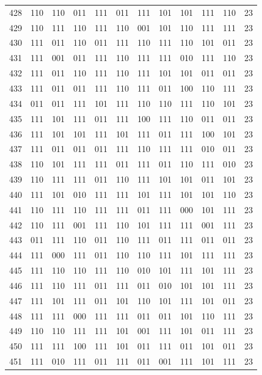 \begin{longtable}{r*{10}{c}r}
428 & 110 & 110 & 011 & 111 & 011 & 111 & 101 & 101 & 111 & 110 & 23\\
429 & 110 & 111 & 110 & 111 & 110 & 001 & 101 & 110 & 111 & 111 & 23\\
430 & 111 & 011 & 110 & 011 & 111 & 110 & 111 & 110 & 101 & 011 & 23\\
431 & 111 & 001 & 011 & 111 & 110 & 111 & 111 & 010 & 111 & 110 & 23\\
432 & 111 & 011 & 110 & 111 & 110 & 111 & 101 & 101 & 011 & 011 & 23\\
433 & 111 & 011 & 011 & 111 & 110 & 111 & 011 & 100 & 110 & 111 & 23\\
434 & 011 & 011 & 111 & 101 & 111 & 110 & 110 & 111 & 110 & 101 & 23\\
435 & 111 & 101 & 111 & 011 & 111 & 100 & 111 & 110 & 011 & 011 & 23\\
436 & 111 & 101 & 101 & 111 & 101 & 111 & 011 & 111 & 100 & 101 & 23\\
437 & 111 & 011 & 011 & 011 & 111 & 110 & 111 & 111 & 010 & 011 & 23\\
438 & 110 & 101 & 111 & 111 & 011 & 111 & 011 & 110 & 111 & 010 & 23\\
439 & 110 & 111 & 111 & 011 & 110 & 111 & 101 & 101 & 011 & 101 & 23\\
440 & 111 & 101 & 010 & 111 & 111 & 101 & 111 & 101 & 101 & 110 & 23\\
441 & 110 & 111 & 110 & 111 & 111 & 011 & 111 & 000 & 101 & 111 & 23\\
442 & 110 & 111 & 001 & 111 & 110 & 101 & 111 & 111 & 001 & 111 & 23\\
443 & 011 & 111 & 110 & 011 & 110 & 111 & 011 & 111 & 011 & 011 & 23\\
444 & 111 & 000 & 111 & 011 & 110 & 110 & 111 & 101 & 111 & 111 & 23\\
445 & 111 & 110 & 110 & 111 & 110 & 010 & 101 & 111 & 101 & 111 & 23\\
446 & 111 & 110 & 111 & 011 & 111 & 011 & 010 & 101 & 101 & 111 & 23\\
447 & 111 & 101 & 111 & 011 & 101 & 110 & 101 & 111 & 101 & 011 & 23\\
448 & 111 & 111 & 000 & 111 & 111 & 011 & 011 & 101 & 110 & 111 & 23\\
449 & 110 & 110 & 111 & 111 & 101 & 001 & 111 & 101 & 011 & 111 & 23\\
450 & 111 & 111 & 100 & 111 & 101 & 011 & 111 & 011 & 101 & 011 & 23\\
451 & 111 & 010 & 111 & 011 & 111 & 011 & 001 & 111 & 101 & 111 & 23\\

\end{longtable}
